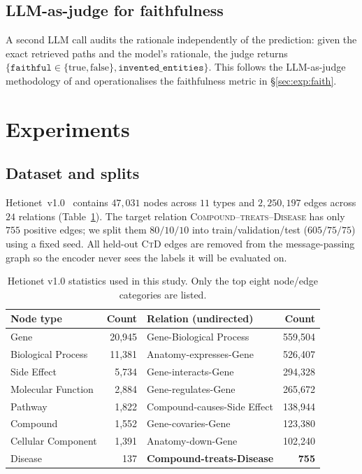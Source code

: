 \documentclass{article}
\newcommand{\ctd}{\textsc{CtD}\xspace}
\begin{document}
\subsection{LLM-as-judge for faithfulness}
\label{sec:method:judge}
A second LLM call audits the rationale independently of the prediction: given the exact retrieved paths and the model's rationale, the judge returns $\{\texttt{faithful}\in\{\mathrm{true},\mathrm{false}\},\texttt{invented\_entities}\}$. This follows the LLM-as-judge methodology of \citet{zheng2023judge} and operationalises the faithfulness metric in \S\ref{sec:exp:faith}.

\section{Experiments}
\label{sec:exp}

\subsection{Dataset and splits}
\label{sec:exp:data}
Hetionet~v1.0~\citep{himmelstein2017} contains $47{,}031$ nodes across $11$ types and $2{,}250{,}197$ edges across $24$ relations (Table~\ref{tab:hetionet}). The target relation \textsc{Compound--treats--Disease} has only $755$ positive edges; we split them $80/10/10$ into train/validation/test ($605/75/75$) using a fixed seed. All held-out \ctd edges are removed from the message-passing graph so the encoder never sees the labels it will be evaluated on.

\begin{table}[t]
\centering
\small
\caption{Hetionet v1.0 statistics used in this study. Only the top eight node/edge categories are listed.}
\label{tab:hetionet}
\begin{tabular}{@{}lrlr@{}}
\toprule
Node type & Count & Relation (undirected)          & Count \\
\midrule
Gene                & 20{,}945 & Gene-Biological Process         & 559{,}504 \\
Biological Process  & 11{,}381 & Anatomy-expresses-Gene          & 526{,}407 \\
Side Effect         & 5{,}734  & Gene-interacts-Gene             & 294{,}328 \\
Molecular Function  & 2{,}884  & Gene-regulates-Gene             & 265{,}672 \\
Pathway             & 1{,}822  & Compound-causes-Side Effect     & 138{,}944 \\
Compound            & 1{,}552  & Gene-covaries-Gene              & 123{,}380 \\
Cellular Component  & 1{,}391  & Anatomy-down-Gene               & 102{,}240 \\
Disease             & 137      & \textbf{Compound-treats-Disease}& \textbf{755} \\
\bottomrule
\end{tabular}
\end{table}
\end{document}
